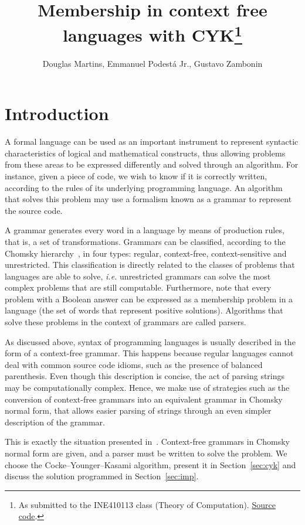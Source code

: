\documentclass[12pt]{article}
\title{Membership in context free languages with CYK\footnote{
    As submitted to the INE410113 class (Theory of Computation). \href{https://github.com/zambonin/ine410113}{Source code}.}}
\author{Douglas Martins\inst{1}, Emmanuel Podestá Jr.\inst{1}, Gustavo Zambonin\inst{1}}
\begin{document}
 

\maketitle

\section{Introduction}\label{sec:intro}

A formal language can be used as an important instrument to represent syntactic characteristics of logical and mathematical constructs, thus allowing problems from these areas to be expressed differently and solved through an algorithm. For instance, given a piece of code, we wish to know if it is correctly written, according to the rules of its underlying programming language. An algorithm that solves this problem may use a formalism known as a grammar to represent the source code.

A grammar generates every word in a language by means of production rules, that is, a set of transformations. Grammars can be classified, according to the Chomsky hierarchy~\cite{}, in four types: regular, context-free, context-sensitive and unrestricted. This classification is directly related to the classes of problems that languages are able to solve, \emph{i.e.} unrestricted grammars can solve the most complex problems that are still computable. Furthermore, note that every problem with a Boolean answer can be expressed as a membership problem in a language (the set of words that represent positive solutions). Algorithms that solve these problems in the context of grammars are called parsers.

As discussed above, syntax of programming languages is usually described in the form of a context-free grammar. This happens because regular languages cannot deal with common source code idioms, such as the presence of balanced parenthesis. Even though this description is concise, the act of parsing strings may be computationally complex. Hence, we make use of strategies such as the conversion of context-free grammars into an equivalent grammar in Chomsky normal form, that allows easier parsing of strings through an even simpler description of the grammar.

This is exactly the situation presented in~\cite{}. Context-free grammars in Chomsky normal form are given, and a parser must be written to solve the problem. We choose the Cocke–Younger–Kasami algorithm, present it in Section~\ref{sec:cyk} and discuss the solution programmed in Section~\ref{sec:imp}.
\end{document}
